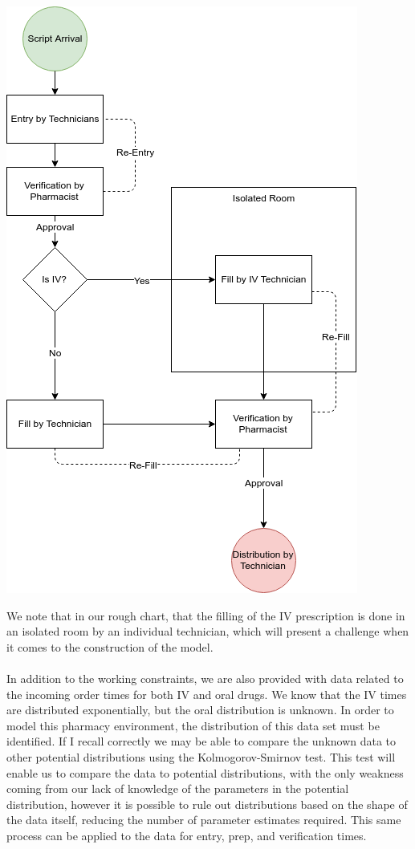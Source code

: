 \documentclass[letterpaper,10pt]{article}
\begin{document}
\begin{center}
\includegraphics[scale=.5]{Flowchart.png}
\end{center}
We note that in our rough chart, that the filling of the IV prescription is done in an isolated room by an individual technician, which will present a challenge when it comes to the construction of the model.\\\\
In addition to the working constraints, we are also provided with data related to the incoming order times for both IV and oral drugs. We know that the IV times are distributed exponentially, but the oral distribution is unknown. In order to model this pharmacy environment, the distribution of this data set must be identified. If I recall correctly we may be able to compare the unknown data to other potential distributions using the Kolmogorov-Smirnov test. This test will enable us to compare the data to potential distributions, with the only weakness coming from our lack of knowledge of the parameters in the potential distribution, however it is possible to rule out distributions based on the shape of the data itself, reducing the number of parameter estimates required. This same process can be applied to the data for entry, prep, and verification times.\\\\
\end{document}
